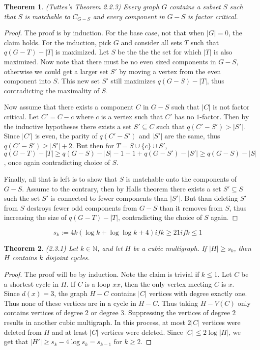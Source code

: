 \documentclass[12pt]{article}
\newtheorem{theorem}{Theorem}
\begin{document}
\begin{theorem} (Tuttes's Theorem 2.2.3) Every graph $G$ contains a
  subset $S$ such that $S$ is matchable to $C_{G - S}$ and every
  component in $G-S$ is factor critical.
\end{theorem}
\begin{proof} The proof is by induction. For the base case, not that
  when $|G| = 0$, the claim holds. For the induction, pick $G$ and
  consider all sets $T$ such that $q(G-T) - |T|$ is maximized. Let $S$
  be the the the set for which $|T|$ is also maximized. Now note that
  there must be no even sized components in $G - S$, otherwise we
  could get a larger set $S'$ by moving a vertex from the even
  component into $S$. This new set $S'$ still maximizes
  $q(G-S) - |T|$, thus contradicting the maximality of $S$.

  Now assume that there exists a component $C$ in $G - S$ such that
  $|C|$ is not factor critical. Let $C' = C-c$ where $c$ is a vertex
  such that $C'$ has no $1$-factor. Then by the inductive hypotheses
  there exists a set $S' \subseteq C$ such that $q(C' - S') >
  |S'|$. Since $|C'|$ is even, the parity of $q(C'-S')$ and $|S'|$ are
  the same, thus $q(C'-S') \geq |S'| + 2$. But then for
  $T = S \cup \{c\} \cup S'$,
  $q(G-T) - |T| \geq q(G-S) - |S| - 1 - 1 + q(G - S') - |S'| \geq
  q(G-S) - |S|$, once again contradicting choice of $S$.

  Finally, all that is left is to show that $S$ is matchable onto the
  components of $G - S$. Assume to the contrary, then by Halls theorem
  there exists a set $S' \subseteq S$ such the set $S'$ is connected
  to fewer components than $|S'|$. But than deleting $S'$ from $S$
  destroys fewer odd components from $G-S$ than it removes from $S$,
  thus increasing the size of $q(G-T) - |T|$, contradicting the choice
  of $S$ again.
\end{proof}

\[
  s_k := 4k(\log k + \log \log k + 4) if k \geq 2 1 if k \leq 1
\]

\begin{theorem} (2.3.1) Let $k \in \mathbb{N}$, and let $H$ be a cubic
  multigraph. If $|H| \geq s_k$, then $H$ contains $k$ disjoint
  cycles.
\end{theorem}
\begin{proof} The proof will be by induction. Note the claim is
  trivial if $k \leq 1$. Let $C$ be a shortest cycle in $H$. If $C$ is
  a loop $xx$, then the only vertex meeting $C$ is $x$. Since
  $d(x) = 3$, the graph $H - C$ contains $|C|$ vertices with degree
  exactly one. Thus none of these vertices are in a cycle in $H -
  C$. Thus taking $H - V(C)$ only contains vertices of degree $2$ or
  degree $3$. Suppressing the vertices of degree $2$ results in
  another cubic multigraph. In this process, at most $2|C|$ vertices
  were deleted from $H$ and at least $|C|$ vertices were
  deleted. Since $|C| \leq 2 \log |H|$, we get that
  $|H'| \geq s_k - 4 \log s_k = s_{k -1 }$ for $k \geq 2$.
\end{proof}
\end{document}
